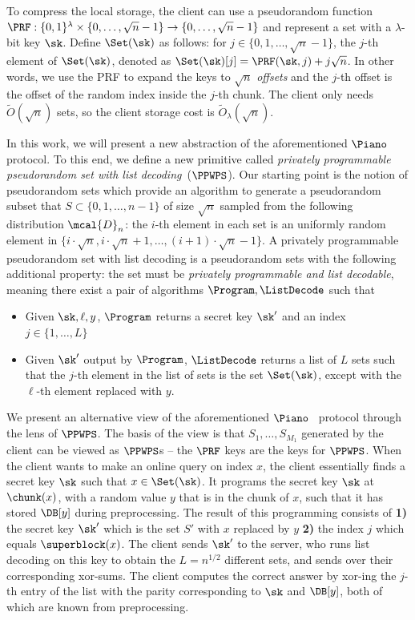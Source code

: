 To compress the local storage, the client can use a pseudorandom function
$\PRF:\{0,1\}^\lambda \times \{0,\dots,\sqrt{n}-1\} \to \{0,\dots,\sqrt{n}-1\}$
and represent a set with a $\lambda$-bit key $\sk$. Define $\Set(\sk)$ as
follows: for $j\in \{0,1,\ldots,\sqrt{n}-1\}$, the $j$-th element of
$\Set(\sk)$, denoted as $\Set(\sk)[j]=\PRF(\sk, j) + j\sqrt{n}$. In other words,
we use the PRF to expand the keys to $\sqrt{n}$ \emph{offsets} and the $j$-th
offset is the offset of the random index inside the $j$-th chunk. The client
only needs $\widetilde{O}(\sqrt{n})$ sets, so the client storage cost is
$\widetilde{O}_\lambda(\sqrt{n})$. 



 In this work, we will present a new abstraction of the aforementioned $\Piano$ protocol. To this end, we define a new primitive called \emph{privately programmable pseudorandom set with list decoding}~($\PPWPS$). Our starting point is the notion of pseudorandom sets which provide an algorithm to generate a pseudorandom subset that $S \subset \{0, 1, \ldots, n-1\}$ of size $\sqrt{n}$ 
sampled from the following distribution
$\mcal{D}_n$: the $i$-th element in each set is an uniformly random element in $\{i\cdot \sqrt{n},i\cdot \sqrt{n}+1,\ldots,(i+1)\cdot \sqrt{n}-1\}$.
A privately programmable pseudorandom set with list decoding is a pseudorandom sets with the following additional property:
the set must be \emph{privately programmable and list decodable}, meaning there exist a pair of algorithms $\Program,\ListDecode$ such that 
\begin{itemize}
    \item Given $\sk,\ell,y$, $\Program$ returns a secret key $\sk'$ and an index $j\in \{1,\ldots,L\}$
    \item Given $\sk'$ output by $\Program$, $\ListDecode$ returns a list of $L$ sets such that the $j$-th element in the list of sets is the set $\Set(\sk)$, except with the $\ell$-th element replaced with $y$.
\end{itemize}

We present an alternative view of the aforementioned $\Piano$~\cite{piano} protocol through the lens of $\PPWPS$.
The basis of the view is that $S_1,\ldots,S_{M_1}$ generated by the client can be viewed as $\PPWPS$s -- the $\PRF$ keys are the keys for $\PPWPS$. When the client wants to make an online query on index $x$, the client essentially finds a secret key $\sk$ such that $x\in \Set(\sk)$. It programs the secret key $\sk$ at $\chunk(x)$, with a random value $y$ that is in the chunk of $x$, such that it has stored $\DB[y]$ during preprocessing. The result of this programming consists of {\bf 1)} the secret key $\sk'$ which is the set $S'$ 
with $x$ replaced by $y$ {\bf 2)} the index $j$ which equals $\superblock(x)$.  The client sends $\sk'$ to the server, who runs list decoding on this key to obtain the $L=n^{1/2}$ different sets, and sends over their corresponding xor-sums. The client computes the correct answer by xor-ing the $j$-th entry of the list with the parity corresponding to $\sk$ and $\DB[y]$, both of which are known from preprocessing.

